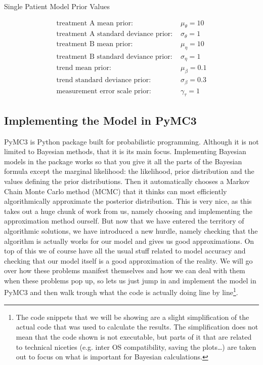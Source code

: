 \documentclass[12pt,a4paper,leqno]{report}
\theoremstyle{plain}
\theoremstyle{definition}
\theoremstyle{remark}
\begin{document}
\begin{table}
    \caption{Single Patient Model Prior Values}
    \label{singlelpatientmodelpriorvalues}
    \begin{align}\label{}
        \text{treatment A mean prior: } & \mu_{\theta} = 10 \nonumber \\
        \text{treatment A standard deviance prior: } & \sigma_{\theta} = 1 \nonumber \\
        \text{treatment B mean prior: } & \mu_{\eta} = 10 \nonumber \\
        \text{treatment B standard deviance prior: } & \sigma_{\eta} = 1 \nonumber \\
        \text{trend mean prior: } & \mu_{\beta} = 0.1 \nonumber \\
        \text{trend standard deviance prior: } & \sigma_{\beta} = 0.3 \nonumber \\
        \text{measurement error scale prior: } & \gamma_{\tau} = 1 \nonumber
    \end{align}
\end{table}

\subsection{Implementing the Model in PyMC3}

PyMC3 is Python package built for probabilistic programming. Although it is not
limited to Bayesian methods, that it is its main focus. Implementing Bayesian models in
the package works so that you give it all the parts of the Bayesian formula except the
marginal likelihood: the likelihood, prior
distribution and the values defining the prior distributions. Then it automatically
chooses a Markov Chain Monte Carlo method (MCMC) that it thinks can most efficiently
algorithmically approximate the posterior distribution. This is very nice, as this takes out a
huge chunk of work from us, namely choosing and implementing the approximation method
ourself. But now that we have entered the territory of algorithmic solutions, we have
introduced a new hurdle, namely checking that the algorithm is actually works for our
model and gives us good approximations. On top of this we of course have all the
usual stuff related to model accuracy and checking that our model itself is a good
approximation of the reality. We will go over how these problems manifest themselves and
how we can deal with them when these problems pop up, so lets us just jump in and
implement the model in PyMC3 and then walk trough what the code is
actually doing line by line\footnote{The code snippets that we will be showing are a
slight simplification of the actual code that was used to calculate the results. The simplification does not mean
that the code shown is not executable, but parts of it that are related to technical niceties
(e.g. inter OS compatibility, saving the plots\ldots) are taken out to focus on what is
important for Bayesian calculations.}.
\end{document}
